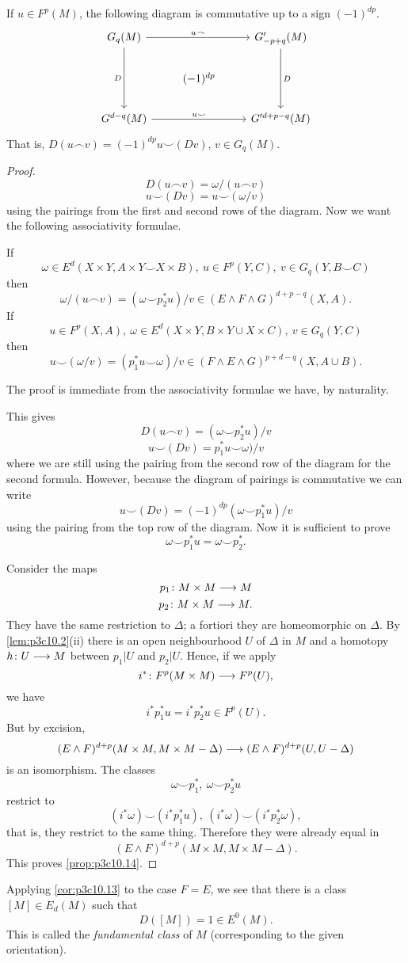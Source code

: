 \documentclass[../main]{subfiles}
\begin{document}
\begin{proposition}\label{prop:p3c10.14}
If $u \in F^p(M)$, the following diagram is commutative up to a sign $(-1)^{dp}$.
\[
\begin{tikzcd}
G_q(M) \arrow[rr, "u \frown"] \arrow[dd, "D"'] &           & G'_{-p + q}(M) \arrow[dd, "D"] \\
                                               & (-1)^{dp} &                                \\
G^{d - q}(M) \arrow[rr, "u \smile"]            &           & G'^{d + p - q}(M)             
\end{tikzcd}
\] 
That is, $D(u \frown v) = (-1)^{dp} u \smile (Dv)$, $v \in G_q(M)$.
\end{proposition}
\begin{proof}
\[D(u \frown v) = \omega / (u \frown v)\] 
\[u \smile (Dv) = u \smile (\omega / v)\]
using the pairings from the first and second rows of the diagram.
Now we want the following associativity formulae.
\begin{lemma}\label{lem:p3c10.15}
If
\[\omega \in E^d(X \times Y, A \times Y \smile X \times B), \ u \in F^p(Y,C), \ v \in G_q(Y,B \smile C)\]
then 
\[\omega / (u \frown v) = (\omega \smile p_2^*u)/v \in (E \wedge F \wedge G)^{d+p-q}(X,A).\]
If \[u \in F^p(X,A), \ \omega \in E^d(X \times Y, B \times Y \cup X \times C), \ v \in G_q(Y,C)\]
then
\[u \smile (\omega / v) = (p_1^* u \smile \omega)/v \in (F \wedge E \wedge G)^{p+d-q}(X,A \cup B).\]
\end{lemma}
The proof is immediate from the associativity formulae we have, by naturality.

This gives
\[D(u \frown v) = (\omega \smile p_2^* u)/v\]
\[u \smile (Dv) = p_1^* u \smile \omega)/v\]
where we are still using the pairing from the second row of the diagram for the second formula. However, because the diagram of pairings is commutative we can write 
\[u \smile (Dv) = (-1)^{dp}(\omega \smile p_1^* u)/v\]
using the pairing from the top row of the diagram. Now it is sufficient to prove
\[\omega \smile p_1^* u = \omega \smile p_2^*.\]

Consider the maps
\[p_1 \colon M \times M \longrightarrow M\]
\[p_2 \colon M \times M \longrightarrow M.\]
They have the same restriction to $\Delta$; a fortiori they are homeomorphic on $\Delta$. By \ref{lem:p3c10.2}(ii) there is an open neighbourhood $U$ of $\Delta$ in $M$ and a homotopy $h \colon U \longrightarrow M$  between $p_1|U$ and $p_2|U$. Hence, if we apply
\[i^*\colon F^p(M \times M) \longrightarrow F^p(U),\]
we have
\[i^* p^*_1 u = i^* p^*_2 u \in F^p(U).\]
But by excision,
\[(E \wedge F)^{d+p}(M \times M, M \times M - \Delta) \longrightarrow (E \wedge F)^{d+p}(U,U-\Delta)\]
is an isomorphism. The classes 
\[\omega \smile p_1^*, \ \omega \smile p_2^*u\]
restrict to 
\[(i^*\omega) \smile (i^*p_1^*u), \ (i^*\omega) \smile (i^* p_2^* \omega),\]
that is, they restrict to the same thing. Therefore they were already equal in
\[(E \wedge F)^{d+p}(M \times M, M \times M - \Delta).\]
This proves \ref{prop:p3c10.14}.
\end{proof}
Applying \ref{cor:p3c10.13} to the case $F=E$, we see that there is a class $[M] \in E_d(M)$ such that
\[D([M]) = 1 \in E^0(M).\]
This is called the \emph{fundamental class}  of $M$ (corresponding to the given orientation).
\end{document}
